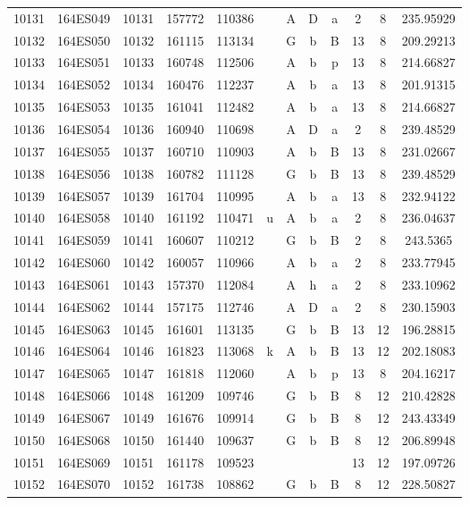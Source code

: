\begin{tabular}{|*{12}{c|}}
10131 & 164ES049 & 10131 & 157772 & 110386 &  & A & D & a & 2 & 8 & 235.95929 \\ 
10132 & 164ES050 & 10132 & 161115 & 113134 &  & G & b & B & 13 & 8 & 209.29213 \\ 
10133 & 164ES051 & 10133 & 160748 & 112506 &  & A & b & p & 13 & 8 & 214.66827 \\ 
10134 & 164ES052 & 10134 & 160476 & 112237 &  & A & b & a & 13 & 8 & 201.91315 \\ 
10135 & 164ES053 & 10135 & 161041 & 112482 &  & A & b & a & 13 & 8 & 214.66827 \\ 
10136 & 164ES054 & 10136 & 160940 & 110698 &  & A & D & a & 2 & 8 & 239.48529 \\ 
10137 & 164ES055 & 10137 & 160710 & 110903 &  & A & b & B & 13 & 8 & 231.02667 \\ 
10138 & 164ES056 & 10138 & 160782 & 111128 &  & G & b & B & 13 & 8 & 239.48529 \\ 
10139 & 164ES057 & 10139 & 161704 & 110995 &  & A & b & a & 13 & 8 & 232.94122 \\ 
10140 & 164ES058 & 10140 & 161192 & 110471 & u & A & b & a & 2 & 8 & 236.04637 \\ 
10141 & 164ES059 & 10141 & 160607 & 110212 &  & G & b & B & 2 & 8 & 243.5365 \\ 
10142 & 164ES060 & 10142 & 160057 & 110966 &  & A & b & a & 2 & 8 & 233.77945 \\ 
10143 & 164ES061 & 10143 & 157370 & 112084 &  & A & h & a & 2 & 8 & 233.10962 \\ 
10144 & 164ES062 & 10144 & 157175 & 112746 &  & A & D & a & 2 & 8 & 230.15903 \\ 
10145 & 164ES063 & 10145 & 161601 & 113135 &  & G & b & B & 13 & 12 & 196.28815 \\ 
10146 & 164ES064 & 10146 & 161823 & 113068 & k & A & b & B & 13 & 12 & 202.18083 \\ 
10147 & 164ES065 & 10147 & 161818 & 112060 &  & A & b & p & 13 & 8 & 204.16217 \\ 
10148 & 164ES066 & 10148 & 161209 & 109746 &  & G & b & B & 8 & 12 & 210.42828 \\ 
10149 & 164ES067 & 10149 & 161676 & 109914 &  & G & b & B & 8 & 12 & 243.43349 \\ 
10150 & 164ES068 & 10150 & 161440 & 109637 &  & G & b & B & 8 & 12 & 206.89948 \\ 
10151 & 164ES069 & 10151 & 161178 & 109523 &  &  &  &  & 13 & 12 & 197.09726 \\ 
10152 & 164ES070 & 10152 & 161738 & 108862 &  & G & b & B & 8 & 12 & 228.50827 \\ 

\end{tabular}
